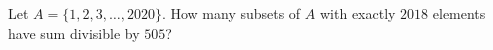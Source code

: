 Let $A=\{1,2,3,\dots,2020\}$. How many subsets of $A$ with exactly $2018$ elements have sum divisible by $505$?
